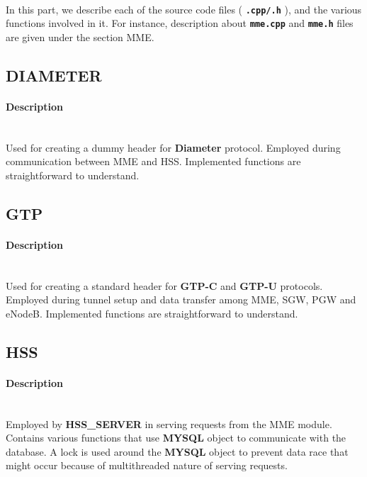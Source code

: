 \documentclass[hidelinks]{report}
\newcommand{\cf}[1] {
	\textbf{\texttt{#1}}
}
\begin{document}
\paragraph*{} In this part, we describe each of the source code files (\cf{.cpp/.h}), and the various functions involved in it. For instance, description about \cf{mme.cpp} and \cf{mme.h} files are given under the section MME.

\subsection*{DIAMETER}

\paragraph*{Description}

~\\ Used for creating a dummy header for \textbf{Diameter} protocol. Employed during communication between MME and HSS. Implemented functions are straightforward to understand.

\subsection*{GTP}

\paragraph*{Description}

~\\ Used for creating a standard header for \textbf{GTP-C} and \textbf{GTP-U} protocols. Employed during tunnel setup and data transfer among MME, SGW, PGW and eNodeB. Implemented functions are straightforward to understand.

\subsection*{HSS}

\paragraph*{Description}

~\\ Employed by \textbf{HSS\_SERVER} in serving requests from the MME module.  Contains various functions that use \textbf{MYSQL} object to communicate with the database. A lock is used around the \textbf{MYSQL} object to prevent data race that might occur because of multithreaded nature of serving requests.
\end{document}
